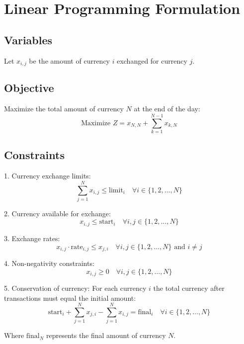 \documentclass{article}
\begin{document}
\section*{Linear Programming Formulation}

\subsection*{Variables}
Let \( x_{i,j} \) be the amount of currency \( i \) exchanged for currency \( j \).

\subsection*{Objective}
Maximize the total amount of currency \( N \) at the end of the day:
\[
\text{Maximize } Z = x_{N,N} + \sum_{k=1}^{N-1} x_{k,N}
\]

\subsection*{Constraints}
1. Currency exchange limits:
\[
\sum_{j=1}^{N} x_{i,j} \leq \text{limit}_i \quad \forall i \in \{1, 2, \ldots, N\}
\]

2. Currency available for exchange:
\[
x_{i,j} \leq \text{start}_i \quad \forall i,j \in \{1, 2, \ldots, N\}
\]

3. Exchange rates:
\[
x_{i,j} \cdot \text{rate}_{i,j} \leq x_{j,i} \quad \forall i,j \in \{1, 2, \ldots, N\} \text{ and } i \neq j
\]

4. Non-negativity constraints:
\[
x_{i,j} \geq 0 \quad \forall i,j \in \{1, 2, \ldots, N\}
\]

5. Conservation of currency:
For each currency \( i \) the total currency after transactions must equal the initial amount:
\[
\text{start}_i + \sum_{j=1}^{N} x_{j,i} - \sum_{j=1}^{N} x_{i,j} = \text{final}_i \quad \forall i \in \{1, 2, \ldots, N\}
\]

Where \( \text{final}_N \) represents the final amount of currency \( N \).
\end{document}

